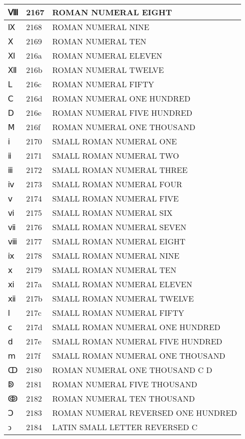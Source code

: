 \documentclass[12pt,letterpaper,openany]{book}
\begin{document}
\begin{center}
\begin{supertabular}{|m{0.25in}|m{0.5in}|m{4in}|}
			Ⅷ & 2167 & ROMAN NUMERAL EIGHT\\\hline
			Ⅸ & 2168 & ROMAN NUMERAL NINE\\\hline
			Ⅹ & 2169 & ROMAN NUMERAL TEN\\\hline
			Ⅺ & 216a & ROMAN NUMERAL ELEVEN\\\hline
			Ⅻ & 216b & ROMAN NUMERAL TWELVE\\\hline
			Ⅼ & 216c & ROMAN NUMERAL FIFTY\\\hline
			Ⅽ & 216d & ROMAN NUMERAL ONE HUNDRED\\\hline
			Ⅾ & 216e & ROMAN NUMERAL FIVE HUNDRED\\\hline
			Ⅿ & 216f & ROMAN NUMERAL ONE THOUSAND\\\hline
			ⅰ & 2170 & SMALL ROMAN NUMERAL ONE\\\hline
			ⅱ & 2171 & SMALL ROMAN NUMERAL TWO\\\hline
			ⅲ & 2172 & SMALL ROMAN NUMERAL THREE\\\hline
			ⅳ & 2173 & SMALL ROMAN NUMERAL FOUR\\\hline
			ⅴ & 2174 & SMALL ROMAN NUMERAL FIVE\\\hline
			ⅵ & 2175 & SMALL ROMAN NUMERAL SIX\\\hline
			ⅶ & 2176 & SMALL ROMAN NUMERAL SEVEN\\\hline
			ⅷ & 2177 & SMALL ROMAN NUMERAL EIGHT\\\hline
			ⅸ & 2178 & SMALL ROMAN NUMERAL NINE\\\hline
			ⅹ & 2179 & SMALL ROMAN NUMERAL TEN\\\hline
			ⅺ & 217a & SMALL ROMAN NUMERAL ELEVEN\\\hline
			ⅻ & 217b & SMALL ROMAN NUMERAL TWELVE\\\hline
			ⅼ & 217c & SMALL ROMAN NUMERAL FIFTY\\\hline
			ⅽ & 217d & SMALL ROMAN NUMERAL ONE HUNDRED\\\hline
			ⅾ & 217e & SMALL ROMAN NUMERAL FIVE HUNDRED\\\hline
			ⅿ & 217f & SMALL ROMAN NUMERAL ONE THOUSAND\\\hline
			ↀ & 2180 & ROMAN NUMERAL ONE THOUSAND C D\\\hline
			ↁ & 2181 & ROMAN NUMERAL FIVE THOUSAND\\\hline
			ↂ & 2182 & ROMAN NUMERAL TEN THOUSAND\\\hline
			Ↄ & 2183 & ROMAN NUMERAL REVERSED ONE HUNDRED\\\hline
			ↄ & 2184 & LATIN SMALL LETTER REVERSED C\\\hline

\end{supertabular}
\end{center}
\end{document}
